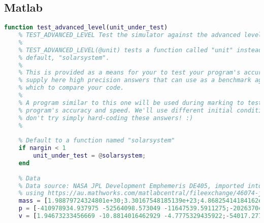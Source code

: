 \subsection{Matlab}
\begin{lstlisting}[language=Matlab]
    function test_advanced_level(unit_under_test)
    % TEST_ADVANCED_LEVEL Test the simulator against the advanced level of achievement.
    %
    % TEST_ADVANCED_LEVEL(@unit) tests a function called "unit" instead of the
    % default, "solarsystem".
    %
    % This is provided as a means for your to test your program's accuracy. We
    % supply here high precision answers that can use as a benchmark against
    % which to compare your code.
    %
    % A program similar to this one will be used during marking to test your
    % program's accuracy and speed. We'll use different initial conditions, so
    % don't try simply hard-coding these answers! :)
    %
    
    % Default to a function named "solarsystem"
    if nargin < 1
        unit_under_test = @solarsystem;
    end
    
    % Data
    % Data source: NASA JPL Development Emphemeris DE405, imported into Matlab
    % using https://au.mathworks.com/matlabcentral/fileexchange/46074-jpl-ephemeris-manager
    mass = [1.98879724324801e+30;3.30167548185139e+23;4.86825414184162e+24;5.97333182929537e+24;6.41814989746695e+23;1.89888757501372e+27;5.68569250232054e+26;8.68357411676561e+25;1.02450682828011e+26;1.47100387814202e+22];
    p = [-410978934.937975 -52564098.573049 -11647539.5911275;-20263704896.5463 37298969437.5484 21998926177.1807;107457059203.846 12751258164.7855 -1081247256.91775;-104473131433.549 95807463843.1787 41554965796.5625;-47532402438.2755 -197479402904.819 -89286739068.5338;740812325977.265 -29623952257.2314 -30753799138.017;-391719672964.493 1189107854643.27 507856891148.711;-2396814857836.84 -1270773906334.37 -522608874439.045;-1545201887440.28 -3957617757444.78 -1581427940931.15;-4371341308972.33 -1084064015240.84 978703610774.062];
    v = [1.94673233456669 -10.8814016462929 -4.7775329435922;-54017.2779417951 -18415.0969798133 -4228.50548119061;-3793.57777814318 31524.0648690534 14419.9306824639;-21597.9402281813 -19392.9951239518 -8410.50277824797;24596.1594690375 -2563.11636886769 -1841.7251251432;538.777252737696 12558.0983493514 5370.16231719295;-9767.15104601119 -2764.87492216388 -721.832483731844;3335.76872430951 -5686.29309895411 -2537.72389267233;5074.99185394443 -1640.69964089467 -797.853610190395;1586.81468930053 -5301.34210829372 -2132.29213550457];
    

\end{lstlisting}
